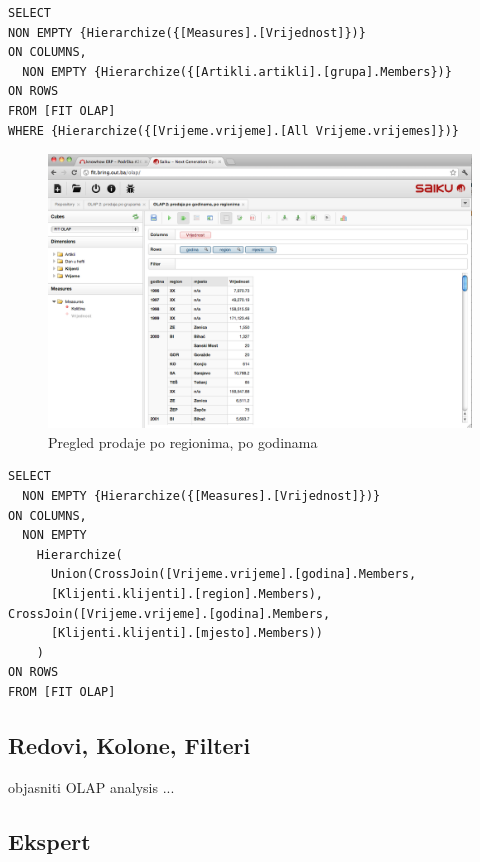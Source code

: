 \documentclass[times, utf8, seminar]{fit}
\begin{document}
\begin{lstlisting}
SELECT
NON EMPTY {Hierarchize({[Measures].[Vrijednost]})} 
ON COLUMNS,
  NON EMPTY {Hierarchize({[Artikli.artikli].[grupa].Members})} 
ON ROWS
FROM [FIT OLAP]
WHERE {Hierarchize({[Vrijeme.vrijeme].[All Vrijeme.vrijemes]})}
\end{lstlisting}


\begin{figure}[H]
\centering
\includegraphics[width=15cm]{img/saiku_rpt_region}
\caption{Pregled prodaje po regionima, po godinama}
\end{figure}

\begin{lstlisting}
SELECT
  NON EMPTY {Hierarchize({[Measures].[Vrijednost]})} 
ON COLUMNS,
  NON EMPTY 
    Hierarchize(
      Union(CrossJoin([Vrijeme.vrijeme].[godina].Members, 
      [Klijenti.klijenti].[region].Members), CrossJoin([Vrijeme.vrijeme].[godina].Members, 
      [Klijenti.klijenti].[mjesto].Members))
    ) 
ON ROWS
FROM [FIT OLAP]
\end{lstlisting}


\subsection{Redovi, Kolone, Filteri}

objasniti OLAP analysis ...



\subsection{Ekspert}
\end{document}
